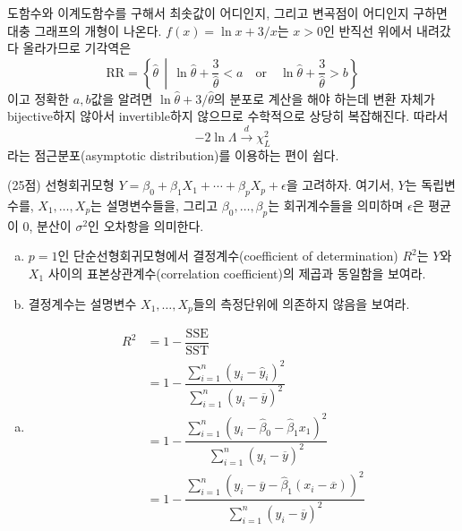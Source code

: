 \documentclass[answers]{exam}
\begin{document}
\begin{questions}
\begin{solution}
        도함수와 이계도함수를 구해서 최솟값이 어디인지, 그리고 변곡점이 어디인지 구하면 대충 그래프의 개형이 나온다. $f\left(x\right)=\ln x+3/x$는 $x>0$인 반직선 위에서 내려갔다 올라가므로 기각역은
        \begin{equation}
          \mathrm{RR}=\left\{\widehat{\theta}\,\middle|\,\ln\widehat{\theta}+\dfrac{3}{\widehat{\theta}}<a\quad \text{or}\quad \ln\widehat{\theta}+\dfrac{3}{\widehat{\theta}}>b \right\}
        \end{equation}
        이고 정확한 $a,b$값을 알려면 $\ln\widehat{\theta}+3/\widehat{\theta}$의 분포로 계산을 해야 하는데 변환 자체가 bijective하지 않아서 invertible하지 않으므로 수학적으로 상당히 복잡해진다. 따라서 
        \begin{equation}
          -2\ln\Lambda \xrightarrow{d}\chi_{L}^{2}
        \end{equation}
        라는 점근분포(asymptotic distribution)를 이용하는 편이 쉽다.
      \end{solution}
    \question
    (25점) 선형회귀모형 $Y=\beta_{0}+\beta_{1}X_{1}+\cdots+\beta_{p}X_{p}+\epsilon$을 고려하자. 여기서, $Y$는 독립변수를, $X_{1},\ldots,X_{p}$는 설명변수들을, 그리고 $\beta_{0},\ldots, \beta_{p}$는 회귀계수들을 의미하며 $\epsilon$은 평균이 $0$, 분산이 $\sigma^{2}$인 오차항을 의미한다.
    \begin{enumerate}[(a)]
      \item $p=1$인 단순선형회귀모형에서 결정계수(coefficient of determination) $R^{2}$는 $Y$와 $X_{1}$ 사이의 표본상관계수(correlation coefficient)의 제곱과 동일함을 보여라.
      \item 결정계수는 설명변수 $X_{1},\ldots,X_{p}$들의 측정단위에 의존하지 않음을 보여라.
    \end{enumerate}
    \begin{solution}
      \begin{enumerate}[(a)]
        \item \begin{align}
          R^{2} &= 1-\dfrac{\text{SSE}}{\text{SST}}\\
          &= 1-\dfrac{\sum_{i=1}^{n} \left(y_{i}-\hat{y}_{i}\right)^{2}}{\sum_{i=1}^{n}\left(y_{i}-\overline{y}\right)^{2}}\\
          &=1-\dfrac{\sum_{i=1}^{n} \left(y_{i}-\widehat{\beta}_{0}-\widehat{\beta}_{1}x_{1}\right)^{2}}{\sum_{i=1}^{n} \left(y_{i}-\overline{y}\right)^{2}}\\
          &=1-\dfrac{\sum_{i=1}^{n}\left(y_{i}-\overline{y}-\widehat{\beta}_{1}\left(x_{i}-\overline{x}\right)\right)^{2}}{\sum_{i=1}^{n}\left(y_{i}-\overline{y}\right)^{2}}\\

\end{align}
\end{enumerate}
\end{solution}
\end{questions}
\end{document}
